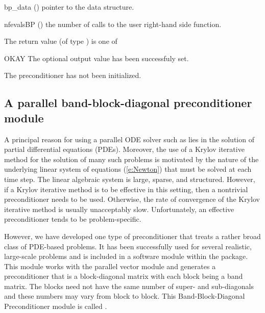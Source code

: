 {
  \begin{args}[nfevalsBP]
  \item[bp\_data] ()
    pointer to the {\cvbandpre} data structure.
  \item[nfevalsBP] ()
    the number of calls to the user right-hand side function.
  \end{args}
}
{
  The return value  (of type ) is one of
  \begin{args}[BP\_NO\_DATA]
  \item[OKAY] 
    The optional output value has been successfuly set.
  \item[\Id{BP\_NO\_DATA}]
    The {\cvbandpre} preconditioner has not been initialized.
  \end{args}
}
{}

\subsection{A parallel band-block-diagonal preconditioner module}\label{sss:cvbbdpre}

A principal reason for using a parallel ODE solver such as {\cvodes} lies
in the solution of partial differential equations (PDEs).  Moreover,
the use of a Krylov iterative method for the solution of many such
problems is motivated by the nature of the underlying linear system of
equations (\ref{e:Newton}) that must be solved at each time step.  The
linear algebraic system is large, sparse, and structured. However, if
a Krylov iterative method is to be effective in this setting, then a
nontrivial preconditioner needs to be used.  Otherwise, the rate of
convergence of the Krylov iterative method is usually unacceptably
slow.  Unfortunately, an effective preconditioner tends to be
problem-specific.

However, we have developed one type of preconditioner that treats a
rather broad class of PDE-based problems.  It has been successfully
used for several realistic, large-scale problems \cite{HiTa:98} and is
included in a software module within the {\cvodes} package. This module
works with the parallel vector module {\nvecp} and 
generates a preconditioner that is a block-diagonal matrix with each
block being a band matrix. The blocks need not have the same number of
super- and sub-diagonals and these numbers may vary from block to
block. This Band-Block-Diagonal Preconditioner module is called
{\cvbbdpre}.

